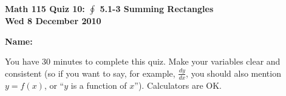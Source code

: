 \documentclass[11pt,letterpaper]{article}
\begin{document}
\flushleft
\begin{multicols}{2}


\begin{large}\textbf{Math 115 Quiz 10: $\oint $ 5.1-3 Summing Rectangles \\
Wed 8 December 2010}\end{large}

\textbf{Name:  }\underline{\hspace{35ex}}

\vspace{.5in}

\end{multicols}

\pagestyle{empty}

\flushleft

You have 30 minutes to complete this quiz.  Make your variables clear and
consistent (so if you want to say, for example, $\frac{dy}{dx}$, you should also
mention $y=f(x)$, or ``$y$ is a function of $x$'').  Calculators are OK.  
\end{document}
